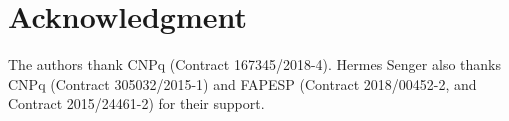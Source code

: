 
\section*{Acknowledgment}

The authors thank CNPq (Contract 167345/2018-4).
Hermes Senger also thanks CNPq (Contract 305032/2015-1) and FAPESP (Contract
2018/00452-2, and Contract 2015/24461-2) for their support.
